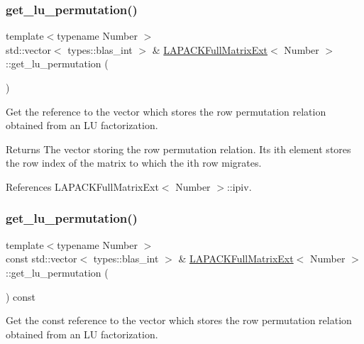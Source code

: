 \subsubsection{\texorpdfstring{get\+\_\+lu\+\_\+permutation()}{get\_lu\_permutation()}\hspace{0.1cm}{\footnotesize\ttfamily [1/2]}}
{\footnotesize\ttfamily template$<$typename Number $>$ \\
std\+::vector$<$ types\+::blas\+\_\+int $>$ \& \hyperlink{classLAPACKFullMatrixExt}{L\+A\+P\+A\+C\+K\+Full\+Matrix\+Ext}$<$ Number $>$\+::get\+\_\+lu\+\_\+permutation (\begin{DoxyParamCaption}{ }\end{DoxyParamCaption})}

Get the reference to the vector which stores the row permutation relation obtained from an LU factorization.

\begin{DoxyReturn}{Returns}
The vector storing the row permutation relation. Its i\textquotesingle{}th element stores the row index of the matrix to which the i\textquotesingle{}th row migrates. 
\end{DoxyReturn}


References L\+A\+P\+A\+C\+K\+Full\+Matrix\+Ext$<$ Number $>$\+::ipiv.

\mbox{\label{classLAPACKFullMatrixExt_a2f435bd8d68ef6da859405ff5c583cd0}} 
\subsubsection{\texorpdfstring{get\+\_\+lu\+\_\+permutation()}{get\_lu\_permutation()}\hspace{0.1cm}{\footnotesize\ttfamily [2/2]}}
{\footnotesize\ttfamily template$<$typename Number $>$ \\
const std\+::vector$<$ types\+::blas\+\_\+int $>$ \& \hyperlink{classLAPACKFullMatrixExt}{L\+A\+P\+A\+C\+K\+Full\+Matrix\+Ext}$<$ Number $>$\+::get\+\_\+lu\+\_\+permutation (\begin{DoxyParamCaption}{ }\end{DoxyParamCaption}) const}

Get the const reference to the vector which stores the row permutation relation obtained from an LU factorization.

